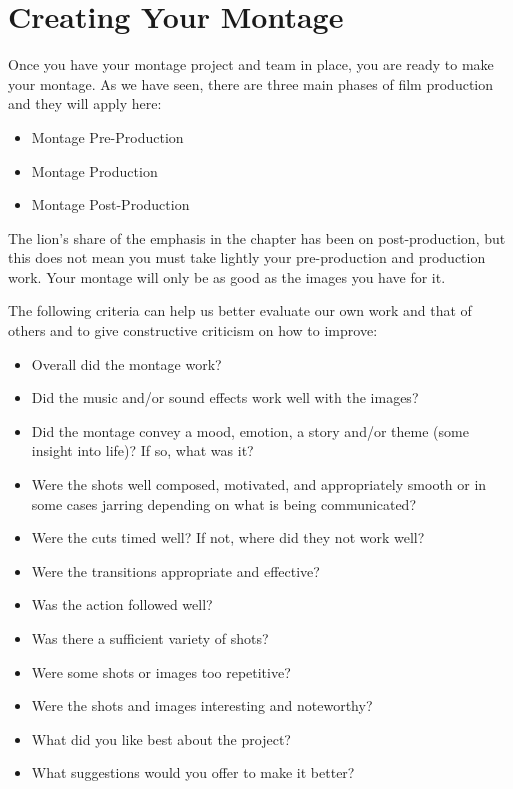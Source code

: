 \documentclass[
]{book}
\providecommand{\tightlist}{%
  \setlength{\itemsep}{0pt}\setlength{\parskip}{0pt}}
\begin{document}
\hypertarget{creating-your-montage}{%
\section{Creating Your Montage}\label{creating-your-montage}}

Once you have your montage project and team in place, you are ready to make your montage. As we have seen, there are three main phases of film production and they will apply here:

\begin{itemize}
\tightlist
\item
  Montage Pre-Production\\
\item
  Montage Production\\
\item
  Montage Post-Production
\end{itemize}

The lion's share of the emphasis in the chapter has been on post-production, but this does not mean you must take lightly your pre-production and production work. Your montage will only be as good as the images you have for it.

The following criteria can help us better evaluate our own work and that of others and to give constructive criticism on how to improve:

\begin{itemize}
\tightlist
\item
  Overall did the montage work?
\item
  Did the music and/or sound effects work well with the images?
\item
  Did the montage convey a mood, emotion, a story and/or theme (some insight into life)? If so, what was it?
\item
  Were the shots well composed, motivated, and appropriately smooth or in some cases jarring depending on what is being communicated?
\item
  Were the cuts timed well? If not, where did they not work well?
\item
  Were the transitions appropriate and effective?
\item
  Was the action followed well?
\item
  Was there a sufficient variety of shots?
\item
  Were some shots or images too repetitive?
\item
  Were the shots and images interesting and noteworthy?
\item
  What did you like best about the project?
\item
  What suggestions would you offer to make it better?
\end{itemize}
\end{document}
